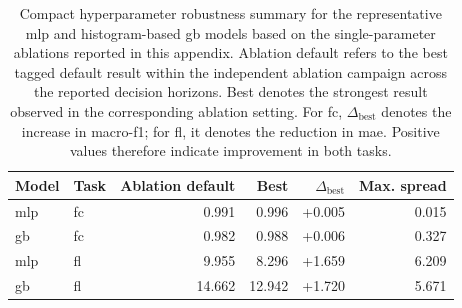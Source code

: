 \begin{table}[pos=ht]
\caption{Compact hyperparameter robustness summary for the representative \ac{mlp} and histogram-based \ac{gb} models based on the single-parameter ablations reported in this appendix. Ablation default refers to the best tagged default result within the independent ablation campaign across the reported decision horizons. Best denotes the strongest result observed in the corresponding ablation setting. For \ac{fc}, $\Delta_{\text{best}}$ denotes the increase in macro-\ac{f1}; for \ac{fl}, it denotes the reduction in \ac{mae}. Positive values therefore indicate improvement in both tasks.}
\small
\label{tab:ablation_robustness_summary_main}
\centering
\begin{tabular}{llrrrr}
\toprule
\textbf{Model} & \textbf{Task} & \textbf{Ablation default} & \textbf{Best} & \textbf{$\Delta_{\text{best}}$} & \textbf{Max. spread} \\
\midrule
\ac{mlp} & \ac{fc} & 0.991 & 0.996 & +0.005 & 0.015 \\
\ac{gb} & \ac{fc} & 0.982 & 0.988 & +0.006 & 0.327 \\
\midrule
\ac{mlp} & \ac{fl} & 9.955 & 8.296 & +1.659 & 6.209 \\
\ac{gb} & \ac{fl} & 14.662 & 12.942 & +1.720 & 5.671 \\
\bottomrule
\end{tabular}
\end{table}
